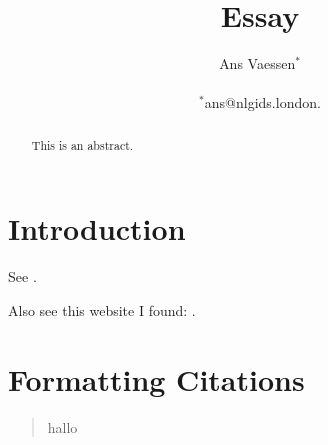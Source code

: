 \documentclass[12pt]{article}
\title{Essay}
\author
{Ans Vaessen$^{\ast}$\\
\\
\normalsize{$^{\ast}$ans@nlgids.london.}\\
}
\date{}
\begin{document}
 
\maketitle 

\begin{abstract}
This is an abstract.
\end{abstract}

\section*{Introduction}

See \cite{Christensen97}.

Also see this website I found: \cite{TripAdvisor}.

\section{Formatting Citations}

\begin{quote}
hallo
\end{quote}

{}
\end{document}
